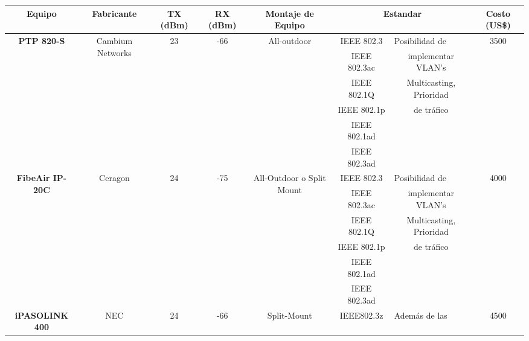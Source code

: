 \begin{table}[H]
  \tiny
  \centering  
    \begin{tabular}{|c|c|c|c|c|c|p{10.945em}|c|}
    \hline
    \rowcolor[rgb]{ .773,  .851,  .945} \textbf{Equipo} & \textbf{Fabricante} & \textbf{TX (dBm)} & \textbf{RX (dBm)} & \textbf{Montaje de Equipo} & \multicolumn{2}{c|}{\textbf{Estandar }} & \textbf{Costo (US\$)} \bigstrut\\
    \hline
    \multirow{6}[2]{*}{\textbf{PTP 820-S}} & \multirow{6}[2]{*}{Cambium Networks} & \multirow{6}[2]{*}{23} & \multirow{6}[2]{*}{-66} & \multirow{6}[2]{*}{All-outdoor} & IEEE 802.3 & Posibilidad de & \multirow{6}[2]{*}{3500} \bigstrut[t]\\
          &       &       &       &       & IEEE 802.3ac & \multicolumn{1}{c|}{implementar VLAN's} &  \\
          &       &       &       &       & IEEE 802.1Q & \multicolumn{1}{c|}{Multicasting, Prioridad} &  \\
          &       &       &       &       & IEEE 802.1p & \multicolumn{1}{c|}{de tráfico} &  \\
          &       &       &       &       & IEEE 802.1ad & \multicolumn{1}{r|}{} &  \\
          &       &       &       &       & IEEE 802.3ad & \multicolumn{1}{r|}{} &  \bigstrut[b]\\
    \hline
    \multirow{6}[2]{*}{\textbf{FibeAir IP-20C}} & \multirow{6}[2]{*}{Ceragon} & \multirow{6}[2]{*}{24} & \multirow{6}[2]{*}{-75} & \multicolumn{1}{c|}{\multirow{6}[2]{*}{All-Outdoor o Split Mount}} & IEEE 802.3 & Posibilidad de & \multirow{6}[2]{*}{4000} \bigstrut[t]\\
          &       &       &       &       & IEEE 802.3ac & \multicolumn{1}{c|}{implementar VLAN's} &  \\
          &       &       &       &       & IEEE 802.1Q & \multicolumn{1}{c|}{Multicasting, Prioridad} &  \\
          &       &       &       &       & IEEE 802.1p & \multicolumn{1}{c|}{de tráfico} &  \\
          &       &       &       &       & IEEE 802.1ad & \multicolumn{1}{r|}{} &  \\
          &       &       &       &       & IEEE 802.3ad & \multicolumn{1}{r|}{} &  \bigstrut[b]\\
    \hline
    \multirow{9}[2]{*}{\textbf{iPASOLINK 400}} & \multirow{9}[2]{*}{NEC} & \multirow{9}[2]{*}{24} & \multirow{9}[2]{*}{-66} & \multirow{9}[2]{*}{Split-Mount} & IEEE802.3z & Además de las  & \multirow{9}[2]{*}{4500} \bigstrut[t]\\

\end{tabular}
\end{table}
